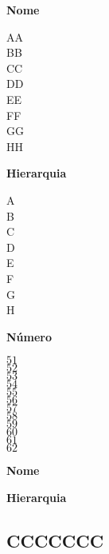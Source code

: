 \documentclass[a4paper,10pt]{article}
\begin{document}
\begin{multicols}{3}
\columnbreak

\begin{center} {\bf Nome} \end{center} 
AA\\
BB\\
CC\\
DD\\
EE\\
FF\\
GG\\
HH\\

\columnbreak

\begin{center} {\bf Hierarquia} \end{center}
A\\
B\\
C\\
D\\
E\\
F\\
G\\
H\\
\end{multicols}

\clearpage

\begin{multicols}{3}	

\begin{center} {\bf N\'umero} \end{center}
$51$\\
$52$\\
$53$\\
$54$\\
$55$\\
$56$\\
$57$\\
$58$\\
$59$\\
$60$\\
$61$\\
$62$\\

\columnbreak
\begin{center} {\bf Nome} \end{center} 

\columnbreak
\begin{center} {\bf Hierarquia} \end{center}

\end{multicols}

\clearpage

\begin{center} \section*{CCCCCCC} \end{center}
\end{document}
